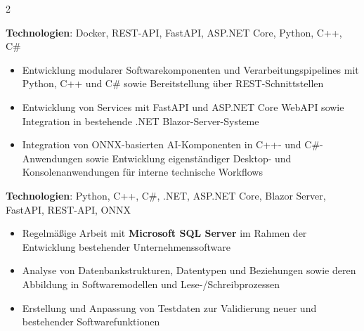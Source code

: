 \documentclass[10pt,a4paper,withhyper]{../altacv}
\begin{document}
\begin{paracol}{2}
  \vspace{1.0em}

  \textbf{Technologien}: Docker, REST-API, FastAPI, ASP.NET Core, Python, C++, C\#

  \vspace{1.5em}


  \vspace{1.0em}

  \begin{itemize}
    \item Entwicklung modularer Softwarekomponenten und Verarbeitungspipelines mit Python, C++ und C\# sowie Bereitstellung über REST-Schnittstellen
    \item Entwicklung von Services mit FastAPI und ASP.NET Core WebAPI sowie Integration in bestehende .NET Blazor-Server-Systeme
    \item Integration von ONNX-basierten AI-Komponenten in C++- und C\#-Anwendungen sowie Entwicklung eigenständiger Desktop- und Konsolenanwendungen für interne technische Workflows
  \end{itemize}

  \vspace{1.0em}

  \textbf{Technologien}: Python, C++, C\#, .NET, ASP.NET Core, Blazor Server, FastAPI, REST-API, ONNX

  \vspace{1.5em}

  \newpage


  \vspace{1.0em}

  \begin{itemize}
    \item Regelmäßige Arbeit mit \textbf{Microsoft SQL Server} im Rahmen der Entwicklung bestehender Unternehmenssoftware
    \item Analyse von Datenbankstrukturen, Datentypen und Beziehungen sowie deren Abbildung in Softwaremodellen und Lese-/Schreibprozessen
    \item Erstellung und Anpassung von Testdaten zur Validierung neuer und bestehender Softwarefunktionen
  \end{itemize}

  \vspace{1.0em}


\end{paracol}
\end{document}
